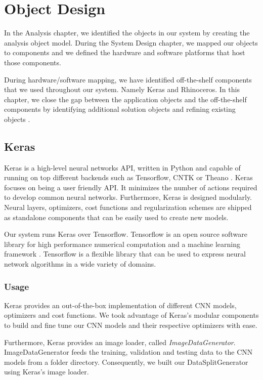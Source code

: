 \chapter{Object Design}
In the Analysis chapter, we identified the objects in our system by creating the analysis object model. During the System Design chapter, we mapped our objects to components and we defined the hardware and software platforms that host those components.

During hardware/software mapping, we have identified off-the-shelf components that we used throughout our system. Namely Keras and Rhinoceros. In this chapter, we close the gap between the application objects and the off-the-shelf components by identifying additional solution objects and refining existing objects \cite{bruegge2004object}.

\section{Keras}
Keras is a high-level neural networks API, written in Python and capable of running on top different backends such as Tensorflow, CNTK or Theano \cite{chollet2015keras}. Keras focuses on being a user friendly API. It minimizes the number of actions required to develop common neural networks. Furthermore, Keras is designed modularly. Neural layers, optimizers, cost functions and regularization schemes are shipped as standalone components that can be easily used to create new models.

Our system runs Keras over Tensorflow. Tensorflow is an open source software library for high performance numerical computation and a machine learning framework \cite{tensorflow2015-whitepaper}. Tensorflow is a flexible library that can be used to express neural network algorithms in a wide variety of domains.

\subsection{Usage}
Keras provides an out-of-the-box implementation of different CNN models, optimizers and cost functions. We took advantage of Keras's modular components to build and fine tune our CNN models and their respective optimizers with ease.

Furthermore, Keras provides an image loader, called \textit{ImageDataGenerator}. ImageDataGenerator feeds the training, validation and testing data to the CNN models from a folder directory. Consequently, we built our DataSplitGenerator using Keras's image loader.

